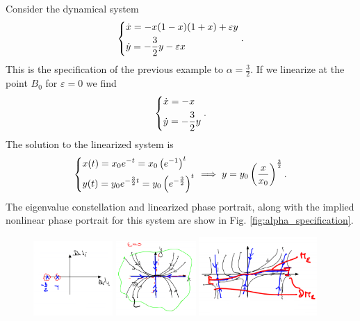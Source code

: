 \begin{ex}[]
	Consider the dynamical system
	\begin{align}
		\begin{dcases}
			\dot{x} = -x(1-x)(1+x) + \varepsilon y \\
			\dot{y} = - \frac{3}{2} y - \varepsilon x
		\end{dcases}
.		
	\end{align}
	This is the specification of the previous example to $\alpha = \frac{3}{2}$. If we linearize at the point $B_0$ for $\varepsilon = 0 $ we find
	\begin{align}
	\begin{dcases}
		\dot{x} = - x \\
		\dot{y} = -\frac{3}{2} y
	\end{dcases}
	.	
	\end{align}
	The solution to the linearized system is
	\begin{align}
		\begin{dcases}
			x(t) = x_0 e^{-t} = x_0 \left(e^{-1} \right)^{t} \\
			y(t) = y_0 e^{-\frac{3}{2}t} = y_0 \left(e^{-\frac{3}{2}}\right)^{t}
		\end{dcases}
		\implies y = y_0 \left(\frac{x}{x_0}\right)^{\frac{3}{2}}.
	\end{align}
	The eigenvalue constellation and linearized phase portrait, along with the implied nonlinear phase portrait for this system are show in Fig. \ref{fig:alpha_specification}.
	\begin{figure}[h!]
		\centering
		\includegraphics[width=0.27\textwidth]{figures/ch9/12alpha_specification_1.png}
		\includegraphics[width=0.27\textwidth]{figures/ch9/12alpha_specification_2.png}
		\includegraphics[width=0.4\textwidth]{figures/ch9/12alpha_specification_3.png}

\end{figure}
\end{ex}
